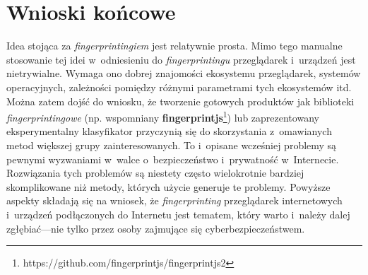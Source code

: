 \section*{Wnioski końcowe}
Idea stojąca za \emph{fingerprintingiem} jest relatywnie prosta. Mimo tego
manualne stosowanie tej idei w~odniesieniu do \emph{fingerprintingu}
przeglądarek i~urządzeń jest nietrywialne. Wymaga ono dobrej znajomości
ekosystemu przeglądarek, systemów operacyjnych, zależności pomiędzy różnymi
parametrami tych ekosystemów itd. Można zatem dojść do wniosku, że tworzenie
gotowych produktów jak biblioteki \emph{fingerprintingowe} (np. wspomniany
\textbf{fingerprintjs}\footnote{https://github.com/fingerprintjs/fingerprintjs2})
lub zaprezentowany eksperymentalny klasyfikator przyczynią się do skorzystania
z~omawianych metod większej grupy zainteresowanych. To i~opisane wcześniej
problemy są pewnymi wyzwaniami w~walce o~bezpieczeństwo i~prywatność
w~Internecie. Rozwiązania tych problemów są niestety często wielokrotnie
bardziej skomplikowane niż metody, których użycie generuje te problemy. Powyższe
aspekty składają się na wniosek, że \emph{fingerprinting} przeglądarek
internetowych i~urządzeń podłączonych do Internetu jest tematem, który warto
i~należy dalej zgłębiać---nie tylko przez osoby zajmujące się
cyberbezpieczeństwem.
